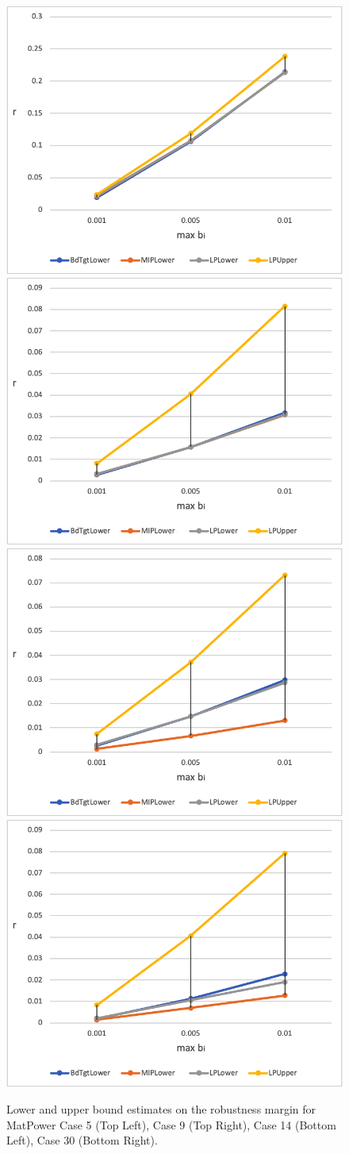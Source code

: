 \medskip
\begin{figure}[htp!]
\begin{center}
  \includegraphics[width=.5\linewidth-0.2mm]{Figures/newcase5.png}\hfill
  \includegraphics[width=.5\linewidth-0.2mm]{Figures/newcase9.png}\\[0.5mm]
  \includegraphics[width=.5\linewidth-0.2mm]{Figures/newcase14.png}\hfill
  \includegraphics[width=.5\linewidth-0.2mm]{Figures/newcase30.png}
\caption{Lower and upper bound estimates on the robustness margin for MatPower Case 5 (Top Left), Case 9 (Top Right), Case 14 (Bottom Left), Case 30 (Bottom Right).} 
\label{fig:Graphs1} 
\end{center}
\end{figure}

